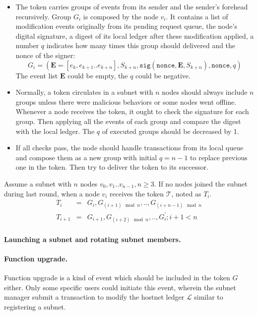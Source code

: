 \documentclass[11pt]{article}
\begin{document}
\begin{itemize}
\item The token carries groups of events from its sender and the sender{'}s forehead recursively.
Group $G_{i}$ is composed by the node $v_{i}$. It contains a list of modification events originally from its pending request queue, the node{'}s digital signature, a digest of its local ledger after these modification applied, a number $q$ indicates how many times this group should delivered and the nonce of the signer:
\begin{equation}
G_{i} = (\mathbf{E} = [e_{k}, e_{k+1}..e_{k+n}], S_{k+n}, \texttt{sig}(\texttt{nonce}, \mathbf{E}, S_{k+n}), \texttt{nonce}, q)
\end{equation}
The event list $\mathbf{E}$ could be empty, the $q$ could be negative.

\item Normally, a token circulates in a subnet with $n$ nodes should always include $n$ groups unless there were malicious behaviors or some nodes went offline.
Whenever a node receives the token, it ought to check the signature for each group.
Then applying all the events of each group and compare the digest with the local ledger.
The $q$ of executed groups should be decreased by 1.

\item If all checks pass, the node should handle transactions from its local queue and compose them as a new group with initial $q=n-1$ to replace previous one in the token.
Then try to deliver the token to its successor.
\end{itemize}

Assume a subnet with $n$ nodes \( v_{0}, v_{1} .. v_{n-1}, n\geq 3\). If no nodes joined the subnet during last round, when a node $v_{i}$ receives the token $\mathcal{T}$, noted as $T_{i}$.
\begin{eqnarray}
T_{i} &=& G_{i}, G_{(i + 1)\mod n},.., G_{(i + n - 1)\mod n}\\
T_{i+1} &=& G_{i+1}, G_{(i+2)\mod n},..,G_{i}^{\prime}; i+1<n
\end{eqnarray}

\paragraph{Launching a subnet and rotating subnet members.}
\paragraph{Function upgrade.}
Function upgrade is a kind of event which should be included in the token $G$ either.
Only some specific users could initiate this event, wherein the subnet manager submit a transaction to modify the hostnet ledger $\mathcal{L}$ similar to registering a subnet.
\end{document}
